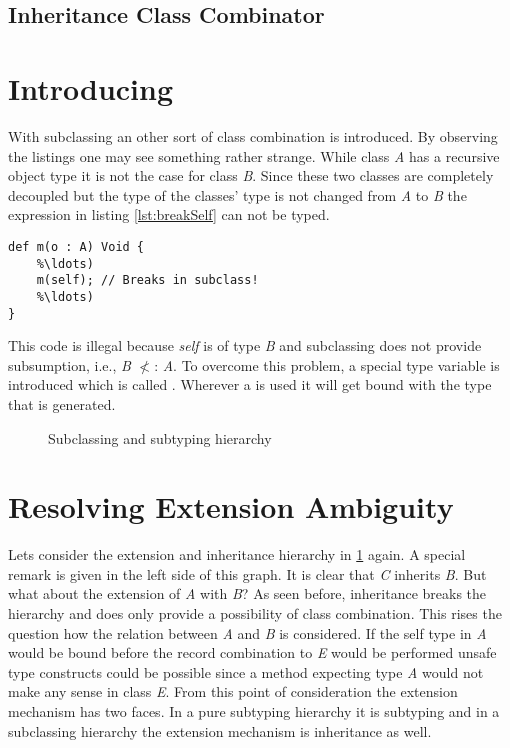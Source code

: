\subsection{Inheritance Class Combinator}

\section{Introducing \mytype}
With subclassing an other sort of class combination is introduced. By
observing the listings  one may see something rather strange. While
class \emph{A} has a recursive object type it is not the case for
class \emph{B}. Since these two classes are completely decoupled but
the type of the classes' type is not changed from \emph{A} to \emph{B}
the expression in listing \ref{lst:breakSelf} can not be typed.

\begin{lstlisting}[float,language=ooplss,caption=Illegal method m(o : \emph{A}) : \emph{Void} in class \emph{B},label=lst:breakSelf]
def m(o : A) Void {
	%\ldots)
	m(self); // Breaks in subclass!
	%\ldots)
}
\end{lstlisting}

This code is illegal because \emph{self} is of type \emph{B} and
subclassing does not provide subsumption, i.e., \emph{B} $\nless$:
\emph{A}. To overcome this problem, a special type variable is
introduced which is called \mytype. Wherever a \mytype is used it will
get bound with the type that is generated.

\begin{figure}[h]
	\centering
	\caption{Subclassing and subtyping hierarchy}
	\label{fig:hierarchy}
\end{figure}

\section{Resolving Extension Ambiguity}
\label{sec:resolveAmbiguity}
Lets consider the extension and inheritance hierarchy in \cref{fig:hierarchy}
again. A special remark is given in the left side of this graph. It is clear
that \emph{C} inherits \emph{B}. But what about the extension of \emph{A} 
with \emph{B}? As seen before, inheritance breaks the hierarchy and does only
provide a possibility of class combination. This rises the question how the 
relation between \emph{A} and \emph{B} is considered. If the self type in 
\emph{A} would be bound before the record combination to \emph{E} would be
performed unsafe type constructs could be possible since a method expecting 
type \emph{A} would not make any sense in class \emph{E}. From this point of 
consideration the extension mechanism has two faces. In a pure subtyping 
hierarchy it is subtyping and in a subclassing hierarchy the extension
mechanism is inheritance as well.

